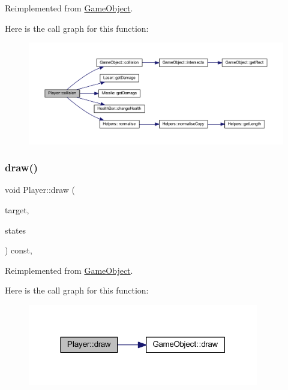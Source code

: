 Reimplemented from \hyperlink{class_game_object_a56a330813f51b91b2ad8aacb42b6d8ea}{Game\+Object}.

Here is the call graph for this function\+:
\nopagebreak
\begin{figure}[H]
\begin{center}
\leavevmode
\includegraphics[width=350pt]{class_player_a669d12e0034e51489a37268b2ca7aab0_cgraph}
\end{center}
\end{figure}
\mbox{\label{class_player_a0ca934f76860c378cd991a8a32f27edd}} 
\subsubsection{\texorpdfstring{draw()}{draw()}}
{\footnotesize\ttfamily void Player\+::draw (\begin{DoxyParamCaption}\item[{sf\+::\+Render\+Target \&}]{target,  }\item[{sf\+::\+Render\+States}]{states }\end{DoxyParamCaption}) const\hspace{0.3cm}{\ttfamily [override]}, {\ttfamily [virtual]}}



Reimplemented from \hyperlink{class_game_object_aa6d7650a920e2dd79b0125560faf3807}{Game\+Object}.

Here is the call graph for this function\+:
\nopagebreak
\begin{figure}[H]
\begin{center}
\leavevmode
\includegraphics[width=285pt]{class_player_a0ca934f76860c378cd991a8a32f27edd_cgraph}
\end{center}
\end{figure}
\mbox{\label{class_player_abe2902b7decc38472183a08977eeb57f}} 
